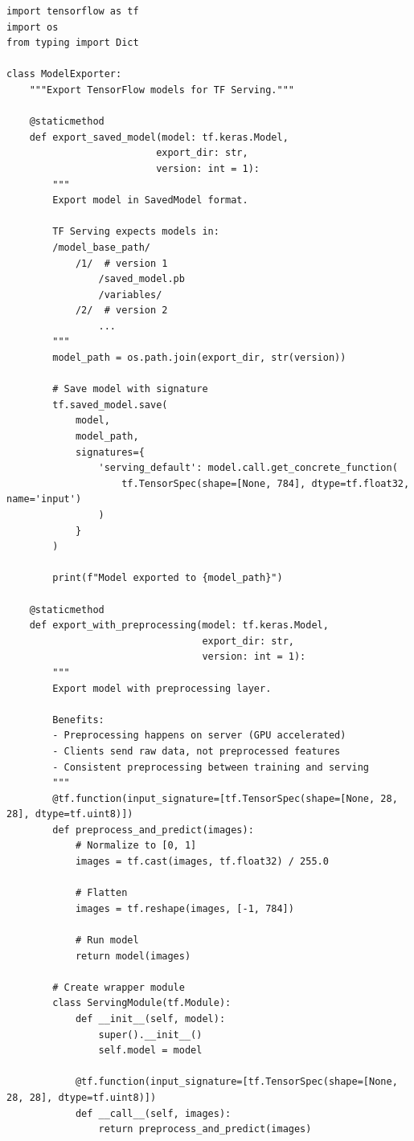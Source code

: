 \begin{lstlisting}[style=python, caption=Prepare model for TensorFlow Serving]
import tensorflow as tf
import os
from typing import Dict

class ModelExporter:
    """Export TensorFlow models for TF Serving."""

    @staticmethod
    def export_saved_model(model: tf.keras.Model,
                          export_dir: str,
                          version: int = 1):
        """
        Export model in SavedModel format.

        TF Serving expects models in:
        /model_base_path/
            /1/  # version 1
                /saved_model.pb
                /variables/
            /2/  # version 2
                ...
        """
        model_path = os.path.join(export_dir, str(version))

        # Save model with signature
        tf.saved_model.save(
            model,
            model_path,
            signatures={
                'serving_default': model.call.get_concrete_function(
                    tf.TensorSpec(shape=[None, 784], dtype=tf.float32, name='input')
                )
            }
        )

        print(f"Model exported to {model_path}")

    @staticmethod
    def export_with_preprocessing(model: tf.keras.Model,
                                  export_dir: str,
                                  version: int = 1):
        """
        Export model with preprocessing layer.

        Benefits:
        - Preprocessing happens on server (GPU accelerated)
        - Clients send raw data, not preprocessed features
        - Consistent preprocessing between training and serving
        """
        @tf.function(input_signature=[tf.TensorSpec(shape=[None, 28, 28], dtype=tf.uint8)])
        def preprocess_and_predict(images):
            # Normalize to [0, 1]
            images = tf.cast(images, tf.float32) / 255.0

            # Flatten
            images = tf.reshape(images, [-1, 784])

            # Run model
            return model(images)

        # Create wrapper module
        class ServingModule(tf.Module):
            def __init__(self, model):
                super().__init__()
                self.model = model

            @tf.function(input_signature=[tf.TensorSpec(shape=[None, 28, 28], dtype=tf.uint8)])
            def __call__(self, images):
                return preprocess_and_predict(images)


\end{lstlisting}
